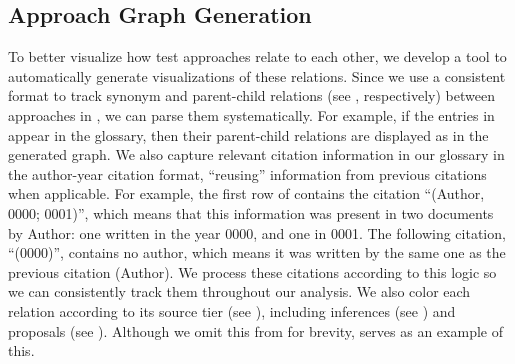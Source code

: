     \subsection{Approach Graph Generation}\label{graph-gen}
\fi

To better visualize how test approaches relate to each other, we
develop a tool to automatically generate visualizations of these relations.
\ifnotpaper
    Since we use a consistent format to track synonym and parent-child
    relations (see , respectively)
    between approaches in \ourApproachGlossary{}, we can parse them
    systematically. For example, if the entries in 
    appear in the glossary, then their parent-child relations are displayed as
     in the generated graph. We also capture relevant
    citation information in our glossary in the author-year citation format,
    ``reusing'' information from previous citations when applicable.
    For example, the first row of 
    contains the citation ``(Author, 0000; 0001)'', which means that this
    information was present in two documents by Author: one written in
    the year 0000, and one in 0001. The following citation, ``(0000)'',
    contains no author, which means it was written by the same one as the
    previous citation (Author). We process these citations according to this
    logic  so we can
    consistently track them throughout our analysis. We also color each
    relation according to its source tier (see ), including
    inferences (see ) and proposals (see ). Although we
    omit this from  for brevity, 
    serves as an example of this.

